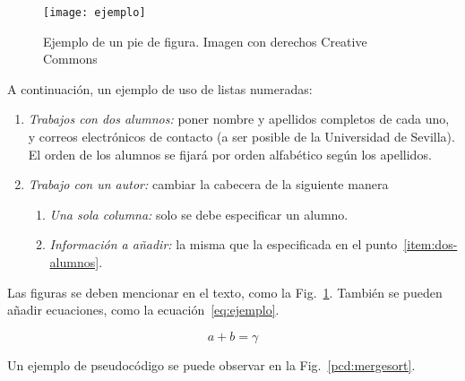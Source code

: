 \documentclass[conference,a4paper]{IEEEtran}
\def\figurename{Fig.}
\begin{document}
\begin{figure}
  \centering
  \texttt{[image: ejemplo]}
  \caption{Ejemplo de un pie de figura. Imagen con derechos Creative Commons}
  \label{fig:ejemplo}
\end{figure}

A continuación, un ejemplo de uso de listas numeradas:
\begin{enumerate}
\item\label{item:dos-alumnos} \textit{Trabajos con dos alumnos:} poner nombre y
  apellidos completos de cada uno, y correos electrónicos de contacto (a ser
  posible de la Universidad de Sevilla). El orden de los alumnos se fijará por
  orden alfabético según los apellidos.
\item \textit{Trabajo con un autor:} cambiar la cabecera de la siguiente manera
  \begin{enumerate}
  \item \textit{Una sola columna:} solo se debe especificar un alumno.
  \item \textit{Información a añadir:} la misma que la especificada en el
    punto~\ref{item:dos-alumnos}.
  \end{enumerate}
\end{enumerate}

Las figuras se deben mencionar en el texto, como la
\figurename~\ref{fig:ejemplo}. También se pueden añadir ecuaciones, como la
ecuación~\eqref{eq:ejemplo}.

\begin{equation}
  \label{eq:ejemplo}
  a + b = \gamma
\end{equation}

Un ejemplo de pseudocódigo se puede observar en la
\figurename~\ref{pcd:mergesort}.
\end{document}
